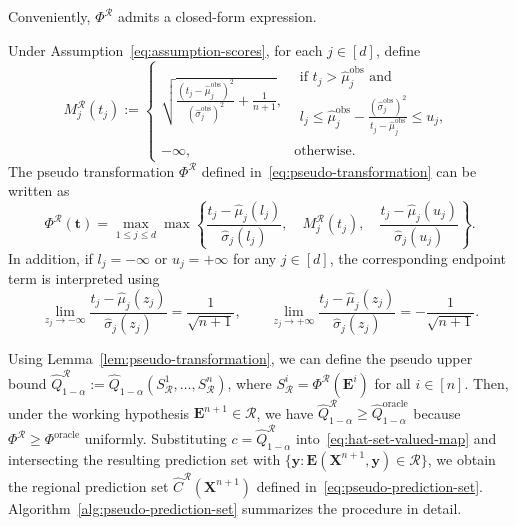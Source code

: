 Conveniently, $\Phi^{\mathcal R}$ admits a closed-form expression.
\begin{lemma}\label{lem:pseudo-transformation}
Under Assumption~\ref{eq:assumption-scores}, for each $j\in[d]$, define
\[
M_j^{\mathcal R}(t_j)
:=
\begin{cases}
\displaystyle
\sqrt{
\frac{(t_j-\hat\mu_j^{\mathrm{obs}})^2}
{(\hat\sigma_j^{\mathrm{obs}})^2}
+\frac1{n+1}
},
&
\begin{array}{l}
\text{if }t_j>\hat\mu_j^{\mathrm{obs}}\text{ and}
\\
l_j\leq
\hat\mu_j^{\mathrm{obs}}
-
\frac{(\hat\sigma_j^{\mathrm{obs}})^2}
{t_j-\hat\mu_j^{\mathrm{obs}}}
\leq u_j,
\end{array}
\\[12pt]
-\infty,
&\text{otherwise}.
\end{cases}
\]
The pseudo transformation $\Phi^{\mathcal R}$ defined in~\eqref{eq:pseudo-transformation} can be written as
\[
\Phi^{\mathcal R}(\mathbf t)
=
\max_{1\leq j\leq d}
\max\left\{
\frac{t_j-\hat\mu_j(l_j)}{\hat\sigma_j(l_j)},
\quad
M_j^{\mathcal R}(t_j),
\quad
\frac{t_j-\hat\mu_j(u_j)}{\hat\sigma_j(u_j)}
\right\}.
\]
In addition, if $l_j=-\infty$ or $u_j=+\infty$ for any $j\in[d]$, the corresponding endpoint term is interpreted using
\[
\lim_{z_j\to-\infty}
\frac{t_j-\hat\mu_j(z_j)}{\hat\sigma_j(z_j)}
=
\frac1{\sqrt{n+1}},
\qquad
\lim_{z_j\to+\infty}
\frac{t_j-\hat\mu_j(z_j)}{\hat\sigma_j(z_j)}
=
-\frac1{\sqrt{n+1}}.
\]
\end{lemma}

Using Lemma~\ref{lem:pseudo-transformation}, we can define the pseudo upper bound
$\hat Q^{\mathcal R}_{1-\alpha}:=\hat Q_{1-\alpha}(S^1_{\mathcal R},\ldots,S^n_{\mathcal R})$,
where $S^i_{\mathcal R}=\Phi^{\mathcal R}(\mathbf E^i)$ for all $i\in[n]$. Then, under the working hypothesis $\mathbf E^{n+1}\in\mathcal R$, we have $\hat Q^{\mathcal R}_{1-\alpha}\geq\hat Q^{\mathrm{oracle}}_{1-\alpha}$ because $\Phi^{\mathcal R}\geq\Phi^{\mathrm{oracle}}$ uniformly.
Substituting $c=\hat Q^{\mathcal R}_{1-\alpha}$ into~\eqref{eq:hat-set-valued-map} and intersecting the resulting prediction set with $\{\mathbf y:\mathbf E(\mathbf X^{n+1},\mathbf y)\in\mathcal R\}$, we obtain the regional prediction set $\hat C^{\mathcal R}(\mathbf X^{n+1})$ defined in~\eqref{eq:pseudo-prediction-set}.
Algorithm~\ref{alg:pseudo-prediction-set} summarizes the procedure in detail. 

